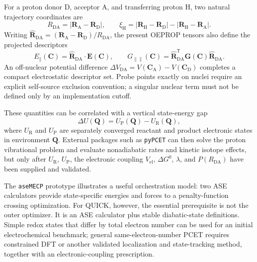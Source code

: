 \documentclass[journal=jctcce,manuscript=article,email=false]{achemso}
\newcommand{\quick}{QUICK}
\begin{document}
For a proton donor D, acceptor A, and transferring proton H, two natural
trajectory coordinates are
\begin{equation}
  R_{\mathrm{DA}}
  =|\mathbf R_{\mathrm A}-\mathbf R_{\mathrm D}|,
  \qquad
  \xi_{\mathrm H}
  =|\mathbf R_{\mathrm H}-\mathbf R_{\mathrm D}|
  -|\mathbf R_{\mathrm H}-\mathbf R_{\mathrm A}|.
\end{equation}
Writing
\(\widehat{\mathbf R}_{\mathrm{DA}}
=(\mathbf R_{\mathrm A}-\mathbf R_{\mathrm D})/R_{\mathrm{DA}}\),
the present OEPROP tensors also define the projected descriptors
\begin{equation}
  E_{\parallel}(\mathbf C)
  =\widehat{\mathbf R}_{\mathrm{DA}}\!\cdot\!\mathbf E(\mathbf C),
  \qquad
  G_{\parallel\parallel}(\mathbf C)
  =\widehat{\mathbf R}_{\mathrm{DA}}^{\mathsf T}
   \mathbf G(\mathbf C)
   \widehat{\mathbf R}_{\mathrm{DA}}.
\end{equation}
An off-nuclear potential difference
\(\Delta V_{\mathrm{DA}}=V(\mathbf C_{\mathrm A})
-V(\mathbf C_{\mathrm D})\) completes a compact electrostatic descriptor
set. Probe points exactly on nuclei require an explicit self-source
exclusion convention; a singular nuclear term must not be defined only by
an implementation cutoff.

These quantities can be correlated with a vertical state-energy gap
\begin{equation}
  \Delta U(\mathbf Q)
  =U_{\mathrm P}(\mathbf Q)-U_{\mathrm R}(\mathbf Q),
\end{equation}
where \(U_{\mathrm R}\) and \(U_{\mathrm P}\) are separately converged
reactant and product electronic states in environment \(\mathbf Q\).
External packages such as \texttt{pyPCET} can then solve the proton
vibrational problem and evaluate nonadiabatic rates and kinetic isotope
effects, but only after \(U_{\mathrm R}\), \(U_{\mathrm P}\), the
electronic coupling \(V_{\mathrm{el}}\), \(\Delta G^0\), \(\lambda\),
and \(P(R_{\mathrm{DA}})\) have been supplied and validated.\cite{HutchisonCuiPCET2025}

The \texttt{aseMECP} prototype illustrates a useful orchestration model:
two ASE calculators provide state-specific energies and forces to a
penalty-function crossing optimization.  For \quick{}, however, the
essential prerequisite is not the outer optimizer.  It is an ASE
calculator plus stable diabatic-state definitions.  Simple redox states
that differ by total electron number can be used for an initial
electrochemical benchmark; general same-electron-number PCET requires
constrained DFT or another validated localization and state-tracking
method, together with an electronic-coupling prescription.
\end{document}

